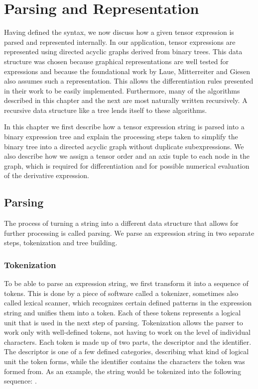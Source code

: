 \documentclass[12pt, a4paper]{report} %
\begin{document}
\chapter{Parsing and Representation}
Having defined the syntax, we now discuss how a given tensor expression is parsed and represented internally.
In our application, tensor expressions are represented using directed acyclic graphs derived from binary trees.
This data structure was chosen because graphical representations are well tested for expressions and because the foundational work \cite{tensorpaper} by Laue, Mitterreiter and Giesen also assumes such a representation.
This allows the differentiation rules presented in their work to be easily implemented.
Furthermore, many of the algorithms described in this chapter and the next are most naturally written recursively.
A recursive data structure like a tree lends itself to these algorithms.

In this chapter we first describe how a tensor expression string is parsed into a binary expression tree and explain the processing steps taken to simplify the binary tree into a directed acyclic graph without duplicate subexpressions.
We also describe how we assign a tensor order and an axis tuple to each node in the graph, which is required for differentiation and for possible numerical evaluation of the derivative expression.

\section{Parsing}
The process of turning a string into a different data structure that allows for further processing is called parsing.
We parse an expression string in two separate steps, tokenization and tree building.

\subsection{Tokenization}
To be able to parse an expression string, we first transform it into a sequence of tokens.
This is done by a piece of software called a tokenizer, sometimes also called lexical scanner, which recognizes certain defined patterns in the expression string and unifies them into a token.
Each of these tokens represents a logical unit that is used in the next step of parsing.
Tokenization allows the parser to work only with well-defined tokens, not having to work on the level of individual characters.
Each token is made up of two parts, the descriptor and the identifier.
The descriptor is one of a few defined categories, describing what kind of logical unit the token forms, while the identifier contains the characters the token was formed from.
As an example, the string  would be tokenized into the following sequence: .
\end{document}

